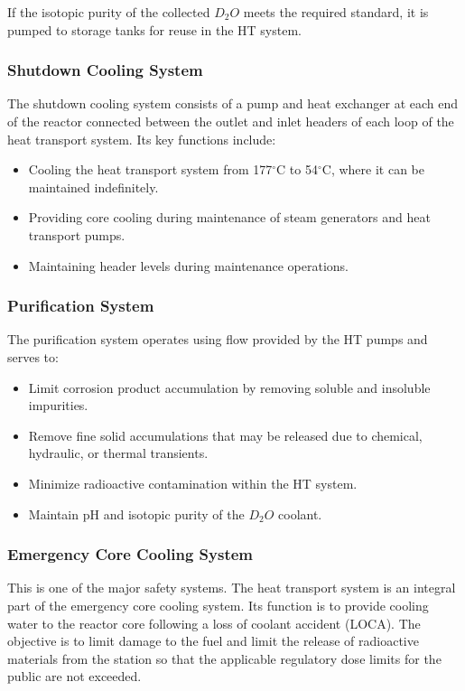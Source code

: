 \documentclass[12pt]{article}
\begin{document}
\begin{multicols}{2}
If the isotopic purity of the collected $D_{2}O$ meets the required standard, it is pumped to storage tanks for reuse in the HT system.

\subsubsection{Shutdown Cooling System}

The shutdown cooling system consists of a pump and heat exchanger at each end of the reactor connected between the outlet and inlet headers of each loop of the heat transport system. Its key functions include:
\begin{itemize}
    \item Cooling the heat transport system from 177$^{\circ}$C to 54$^{\circ}$C, where it can be maintained indefinitely.
    \item Providing core cooling during maintenance of steam generators and heat transport pumps.
    \item Maintaining header levels during maintenance operations.
\end{itemize}

\subsubsection{Purification System}

The purification system operates using flow provided by the HT pumps and serves to:
\begin{itemize}
    \item Limit corrosion product accumulation by removing soluble and insoluble impurities.
    \item Remove fine solid accumulations that may be released due to chemical, hydraulic, or thermal transients.
    \item Minimize radioactive contamination within the HT system.
    \item Maintain pH and isotopic purity of the $D_2O$ coolant.
\end{itemize}

\subsubsection{Emergency Core Cooling System}

This is one of the major safety systems. The heat transport system is an integral part of the emergency core cooling system. Its function is to provide cooling water to the reactor core following a loss of coolant accident (LOCA). The objective is to limit damage to the fuel and limit the release of radioactive materials from the station so that the applicable regulatory dose limits for the public are not exceeded.

    
\end{multicols}
\end{document}

